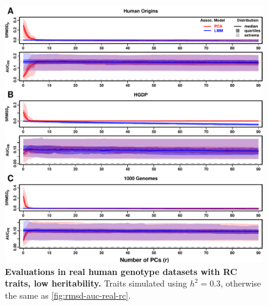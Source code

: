 \documentclass[11pt]{article}
\begin{document}
\begin{figure}[hp!]
  \centering
  \includegraphics[width=\textwidth,height=\textheight,keepaspectratio]{m_causal_fac-27/h0.3/rmsd-auc-real.pdf}
  \caption{
    {\bf Evaluations in real human genotype datasets with RC traits, low heritability.}
    Traits simulated using $h^2=0.3$, otherwise the same as \cref{fig:rmsd-auc-real-rc}.
  }
  \label{fig:rmsd-auc-real-rc-h3}
\end{figure}
\end{document}
